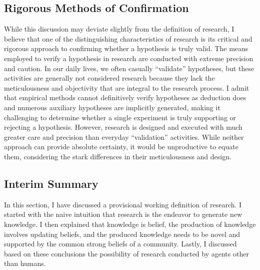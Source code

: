 \documentclass{book}
\begin{document}
\subsection{Rigorous Methods of Confirmation}
While this discussion may deviate slightly from the definition of research, I believe that one of the distinguishing characteristics of research is its critical and rigorous approach to confirming whether a hypothesis is truly valid. The means employed to verify a hypothesis in research are conducted with extreme precision and caution. In our daily lives, we often casually ``validate'' hypotheses, but these activities are generally not considered research because they lack the meticulousness and objectivity that are integral to the research process. I admit that empirical methods cannot definitively verify hypotheses as deduction does and numerous auxiliary hypotheses are implicitly generated, making it challenging to determine whether a single experiment is truly supporting or rejecting a hypothesis. However, research is designed and executed with much greater care and precision than everyday ``validation'' activities. While neither approach can provide absolute certainty, it would be unproductive to equate them, considering the stark differences in their meticulousness and design.


\subsection{Interim Summary}
In this section, I have discussed a provisional working definition of research. I started with the naive intuition that research is the endeavor to generate new knowledge. I then explained that knowledge is belief, the production of knowledge involves updating beliefs, and the produced knowledge needs to be novel and supported by the common strong beliefs of a community. Lastly, I discussed based on these conclusions the possibility of research conducted by agents other than humans.
\end{document}
